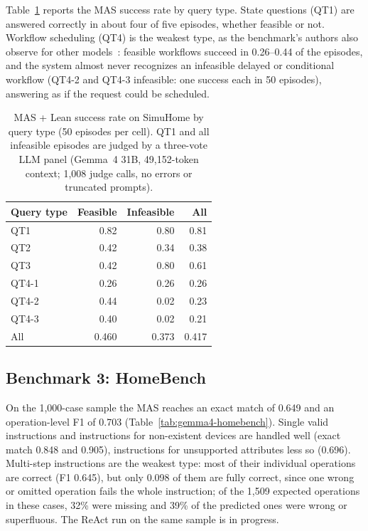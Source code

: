 \documentclass[a4paper,11pt]{article}
\begin{document}
Table~\ref{tab:gemma4-simuhome} reports the MAS success rate by query type. State questions
(QT1) are answered correctly in about four of five episodes, whether feasible or not. Workflow
scheduling (QT4) is the weakest type, as the benchmark's authors also observe for other
models~\cite{simuhome}: feasible workflows succeed in 0.26--0.44 of the episodes, and the system
almost never recognizes an infeasible delayed or conditional workflow (QT4-2 and QT4-3 infeasible:
one success each in 50 episodes), answering as if the request could be scheduled.

\begin{table}[htbp]
  \centering
  \small
  \caption{MAS + Lean success rate on SimuHome by query type (50 episodes per cell). QT1 and all
    infeasible episodes are judged by a three-vote LLM panel (Gemma~4 31B, 49,152-token context;
    1,008 judge calls, no errors or truncated prompts).}
  \label{tab:gemma4-simuhome}
  \begin{tabular}{lrrr}
    \toprule
    Query type & Feasible & Infeasible & All   \\
    \midrule
    QT1        & 0.82     & 0.80       & 0.81  \\
    QT2        & 0.42     & 0.34       & 0.38  \\
    QT3        & 0.42     & 0.80       & 0.61  \\
    QT4-1      & 0.26     & 0.26       & 0.26  \\
    QT4-2      & 0.44     & 0.02       & 0.23  \\
    QT4-3      & 0.40     & 0.02       & 0.21  \\
    \midrule
    All        & 0.460    & 0.373      & 0.417 \\
    \bottomrule
  \end{tabular}
\end{table}

\subsection{Benchmark 3: HomeBench}
\label{sec:eval-homebench}

On the 1,000-case sample the MAS reaches an exact match of 0.649 and an operation-level F1 of
0.703 (Table~\ref{tab:gemma4-homebench}). Single valid instructions and instructions for
non-existent devices are handled well (exact match 0.848 and 0.905), instructions for unsupported
attributes less so (0.696). Multi-step instructions are the weakest type: most of their individual
operations are correct (F1 0.645), but only 0.098 of them are fully correct, since one wrong or
omitted operation fails the whole instruction; of the 1,509 expected operations in these cases,
32\% were missing and 39\% of the predicted ones were wrong or superfluous. The ReAct run on the
same sample is in progress.
\end{document}

